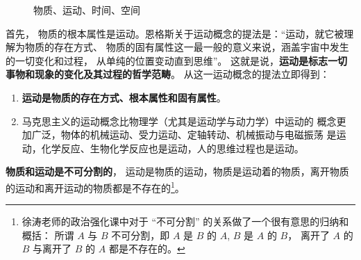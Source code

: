 \documentclass[11pt, UTF8]{book} %
\begin{document}
\begin{figure}[H]
\caption{物质、运动、时间、空间}
\end{figure}

首先，
物质的根本属性是运动。恩格斯关于运动概念的提法是：“运动，就它被理解为物质的存在方式、
物质的固有属性这一最一般的意义来说，涵盖宇宙中发生的一切变化和过程，
从单纯的位置变动直到思维”。
这就是说，\textbf{运动是标志一切事物和现象的变化及其过程的哲学范畴}。
从这一运动概念的提法立即得到：
\begin{enumerate}[label={${\arabic*}^\circ$}, itemsep=0pt]
    \item \textbf{运动是物质的存在方式、根本属性和固有属性}。
    \item 马克思主义的运动概念比物理学（尤其是运动学与动力学）中运动的
    概念更加广泛，物体的机械运动、受力运动、定轴转动、机械振动与电磁振荡
    是运动，化学反应、生物化学反应也是运动，人的思维过程也是运动。
\end{enumerate}
\textbf{物质和运动是不可分割的}，
运动是物质的运动，物质是运动着的物质，离开物质的运动和离开运动的物质都是不存在的\footnote{
    徐涛老师的政治强化课中对于 “不可分割” 的关系做了一个很有意思的归纳和概括：
    所谓 $A$ 与 $B$ 不可分割，即 $A$ 是 $B$ 的 $A$, $B$ 是 $A$ 的 $B$，
    离开了 $A$ 的 $B$ 与离开了 $B$ 的 $A$ 都是不存在的。
}。



\end{document}
